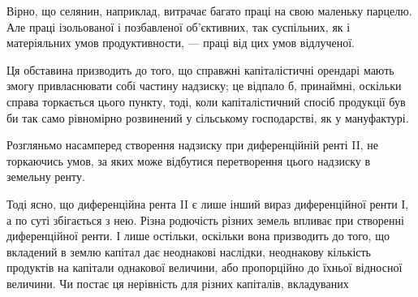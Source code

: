 Вірно, що селянин, наприклад, витрачає багато праці на свою маленьку
парцелю. Але праці ізольованої і позбавленої об’єктивних, так суспільних, як і
матеріяльних умов продуктивности, — праці від цих умов відлученої.

Ця обставина призводить до того, що справжні капіталістичні орендарі
мають змогу привласнювати собі частину надзиску; це відпало б, принаймні,
оскільки справа торкається цього пункту, тоді, коли капіталістичний спосіб продукції
був би так само рівномірно розвинений у сільському господарстві, як у
мануфактурі.

Розгляньмо насамперед створення надзиску при диференційній ренті II, не
торкаючись умов, за яких може відбутися перетворення цього надзиску в земельну
ренту.

Тоді ясно, що диференційна рента II є лише інший вираз диференційної
ренти І, а по суті збігається з нею. Різна родючість різних земель впливає при
створенні диференційної ренти. І лише остільки, оскільки вона призводить до
того, що вкладений в землю капітал дає неоднакові наслідки, неоднакову кількість
продуктів на капітали однакової величини, або пропорційно до їхньої відносної
величини. Чи постає ця нерівність для різних капіталів, вкладуваних
\parbreak{}  %

